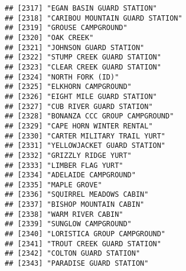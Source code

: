 \documentclass[
]{article}
\begin{document}
\begin{verbatim}
## [2317] "EGAN BASIN GUARD STATION"                                                            
## [2318] "CARIBOU MOUNTAIN GUARD STATION"                                                      
## [2319] "GROUSE CAMPGROUND"                                                                   
## [2320] "OAK CREEK"                                                                           
## [2321] "JOHNSON GUARD STATION"                                                               
## [2322] "STUMP CREEK GUARD STATION"                                                           
## [2323] "CLEAR CREEK GUARD STATION"                                                           
## [2324] "NORTH FORK (ID)"                                                                     
## [2325] "ELKHORN CAMPGROUND"                                                                  
## [2326] "EIGHT MILE GUARD STATION"                                                            
## [2327] "CUB RIVER GUARD STATION"                                                             
## [2328] "BONANZA CCC GROUP CAMPGROUND"                                                        
## [2329] "CAPE HORN WINTER RENTAL"                                                             
## [2330] "CARTER MILITARY TRAIL YURT"                                                          
## [2331] "YELLOWJACKET GUARD STATION"                                                          
## [2332] "GRIZZLY RIDGE YURT"                                                                  
## [2333] "LIMBER FLAG YURT"                                                                    
## [2334] "ADELAIDE CAMPGROUND"                                                                 
## [2335] "MAPLE GROVE"                                                                         
## [2336] "SQUIRREL MEADOWS CABIN"                                                              
## [2337] "BISHOP MOUNTAIN CABIN"                                                               
## [2338] "WARM RIVER CABIN"                                                                    
## [2339] "SUNGLOW CAMPGROUND"                                                                  
## [2340] "LORISTICA GROUP CAMPGROUND"                                                          
## [2341] "TROUT CREEK GUARD STATION"                                                           
## [2342] "COLTON GUARD STATION"                                                                
## [2343] "PARADISE GUARD STATION"                                                              

\end{verbatim}
\end{document}
